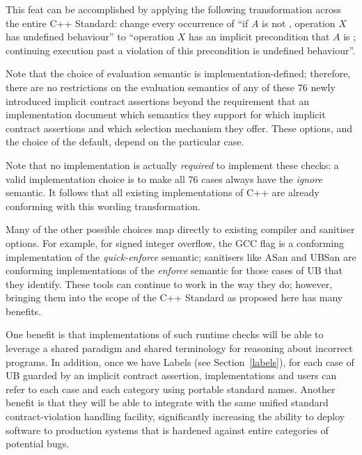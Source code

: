 {This feat can be accomplished by applying the following transformation across the entire C++ Standard: change every occurrence of “if $A$ is not , operation $X$ has undefined behaviour'' to ``operation $X$ has an implicit precondition that $A$ is ; continuing execution past a violation of this precondition is undefined behaviour''.

Note that the choice of evaluation semantic is implementation-defined; therefore, there are no restrictions on the evaluation semantics of any of these 76 newly introduced  implicit contract assertions beyond the requirement that an implementation document which semantics they support for which implicit contract assertions and which selection mechanism they offer. These options, and the choice of the default, depend on the particular case. 

Note that no implementation is actually \emph{required} to implement these checks: a valid implementation choice is to make all 76 cases always have the \emph{ignore} semantic. It follows that all existing implementations of C++ are already conforming with this wording transformation. 

Many of the other possible choices map directly to existing compiler and sanitiser options. For example, for signed integer overflow, the GCC flag  is a conforming implementation of the \emph{quick-enforce} semantic; sanitisers like ASan and UBSan are conforming implementations of the \emph{enforce} semantic for those cases of UB that they identify. These tools can continue to work in the way they do; however, bringing them into the scope of the C++ Standard as proposed here has many benefits.

One benefit is that implementations of such runtime checks will be able to leverage a shared paradigm and shared terminology for reasoning about incorrect programs. In addition, once we have Labels (see Section~\ref{labels}), for each case of UB guarded by an implicit contract assertion, implementations and users can refer to each case and each category using portable standard names.  Another benefit is that they will be able to integrate with the same unified standard contract-violation handling facility, significantly increasing the ability to deploy software to production systems that is hardened against entire categories of potential bugs. 

}
